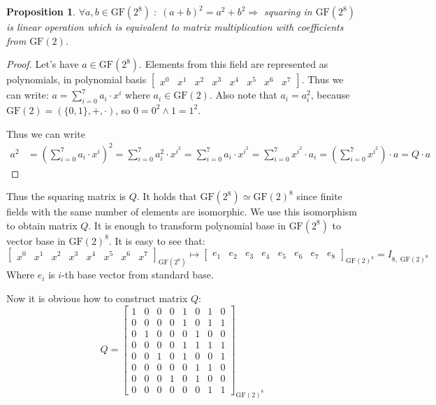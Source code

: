 \documentclass[11pt,oneside,final]{fithesis2}
\newtheorem{myprop}{Proposition}
\newcommand{\gfe}{\ensuremath{\text{GF}\left(2^8\right)}}
\newcommand{\gf}{\ensuremath{\text{GF}\left(2\right)}}
\begin{document}
    \begin{myprop}
    $\forall a,b \in \gfe \; : \; \left(a + b\right)^2 = a^2 + b^2 \Rightarrow $ squaring in $\gfe$ is linear operation which is 
    equivalent to matrix multiplication with coefficients from $\gf$.
    \end{myprop}
    \begin{proof}
    Let's have $a \in \gfe$. Elements from this field are represented as
    polynomials, in polynomial basis $\begin{bmatrix} x^0 & x^{1} & x^{2} & x^{3} & x^{4} & x^{5} & x^{6} & x^{7}\end{bmatrix}$. 
    Thus we can write: $a = \sum_{i=0}^7 a_i \cdot x^i$ where $a_i \in \gf$. Also note that
    $a_i = a_i^2$, because $\gf = \left(\{0,1\}, +, \cdot\right)$, so $0=0^2 \wedge 1=1^2$.

    Thus we can write
    \begin{align*}
	a^2 &= \left(\sum_{i=0}^7 a_i   \cdot x^i\right)^2 
	    =       \sum_{i=0}^7 a_i^2 \cdot x^{i^2} 
	    =       \sum_{i=0}^7 a_i \cdot x^{i^2} 
	    =       \sum_{i=0}^7 x^{i^2} \cdot a_i
	    = \left(\sum_{i=0}^7 x^{i^2}\right) \cdot a
	    = Q \cdot a
    \end{align*}
    \end{proof}
    Thus the squaring matrix is $Q$. It holds that $\gfe \simeq \gf^8$ since finite fields with the same number of elements are isomorphic. 
    We use this isomorphism to obtain matrix $Q$. It is enough to transform polynomial base in $\gfe$ to vector base in $\gf^8$. It is easy to see that:
    \begin{equation*}
     \begin{bmatrix} x^0 & x^{1} & x^{2} & x^{3} & x^{4} & x^{5} & x^{6} & x^{7}\end{bmatrix}_{\gfe} \mapsto \begin{bmatrix} e_1 & e_2 & e_3 & e_4 & e_5 & e_6 & e_7 & e_8\end{bmatrix}_{\gf^8} = I_{8,\;\gf^8}
    \end{equation*}
    Where $e_i$ is $i$-th base vector from standard base.
    
    Now it is obvious how to construct matrix $Q$:
    \begin{equation*}
     Q = \begin{bmatrix} 
	    1 & 0 & 0 & 0 & 1 & 0 & 1 & 0\\
	    0 & 0 & 0 & 0 & 1 & 0 & 1 & 1\\
	    0 & 1 & 0 & 0 & 0 & 1 & 0 & 0\\
	    0 & 0 & 0 & 0 & 1 & 1 & 1 & 1\\
	    0 & 0 & 1 & 0 & 1 & 0 & 0 & 1\\
	    0 & 0 & 0 & 0 & 0 & 1 & 1 & 0\\
	    0 & 0 & 0 & 1 & 0 & 1 & 0 & 0\\
	    0 & 0 & 0 & 0 & 0 & 0 & 1 & 1
         \end{bmatrix}_{\gf^8}
    \end{equation*}
\end{document}

